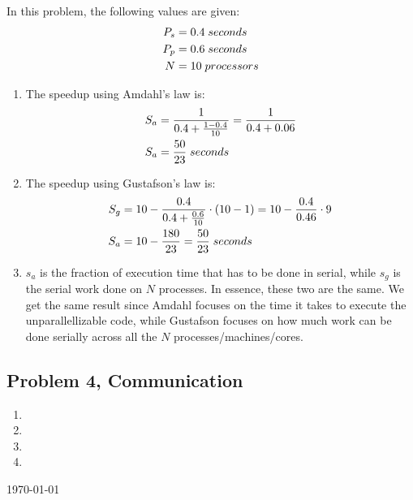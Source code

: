 \documentclass[fontsize=11pt, paper=a4, titlepage]{article}
\begin{document}
In this problem, the following values are given:
\begin{align*}
    P_s &= 0.4\thickspace seconds \\
    P_p &= 0.6\thickspace seconds \\
    N &= 10\thickspace processors
\end{align*}

\begin{enumerate}
\renewcommand{\theenumi}{\alph{enumi})}
    \item The speedup using Amdahl's law is:
    \begin{align*}
        S_a &= \frac{1}{0.4 + \frac{1-0.4}{10}} = \frac{1}{0.4+0.06} \\
        S_a &= \frac{50}{23}\thickspace seconds
    \end{align*}

    \item The speedup using Gustafson's law is:
    \begin{align*}
        S_g &= 10 - \frac{0.4}{0.4 + \frac{0.6}{10}}\cdot (10-1) = 10 - \frac{0.4}{0.46}\cdot 9 \\
        S_a &= 10 - \frac{180}{23} = \frac{50}{23}\thickspace seconds
    \end{align*}

    \item $s_a$ is the fraction of execution time that has to be done in serial,
while $s_g$ is the serial work done on $N$ processes. In essence, these two are
the same. We get the same result since Amdahl focuses on the time it takes to
execute the unparallellizable code, while Gustafson focuses on how much work can
be done serially across all the $N$ processes/machines/cores.

\end{enumerate}

\subsection{Problem 4, Communication}

\begin{enumerate}
\renewcommand{\theenumi}{\alph{enumi})}

    \item

    \item

    \item

    \item

\end{enumerate}

\vfill
\large{\today}
\end{document}
